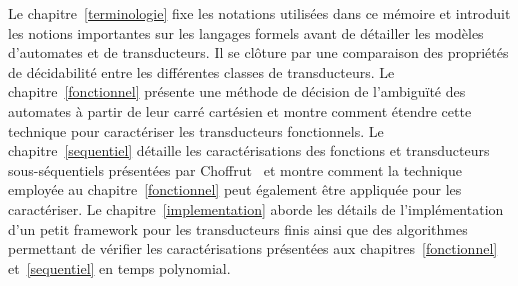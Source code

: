 Le chapitre~\ref{terminologie} fixe les notations utilisées dans ce mémoire et introduit les notions importantes sur les langages formels avant de détailler les modèles d'automates et de transducteurs. Il se clôture par une comparaison des propriétés de décidabilité entre les différentes classes de transducteurs.
Le chapitre~\ref{fonctionnel} présente une méthode de décision de l'ambiguïté des automates à partir de leur carré cartésien et montre comment étendre cette technique pour caractériser les transducteurs fonctionnels.
Le chapitre~\ref{sequentiel} détaille les caractérisations des fonctions et transducteurs sous-séquentiels présentées par Choffrut~\cite{Cho77} et montre comment la technique employée au chapitre~\ref{fonctionnel} peut également être appliquée pour les caractériser.
Le chapitre~\ref{implementation} aborde les détails de l'implémentation d'un petit framework pour les transducteurs finis ainsi que des algorithmes permettant de vérifier les caractérisations présentées aux chapitres~\ref{fonctionnel} et~\ref{sequentiel} en temps polynomial.